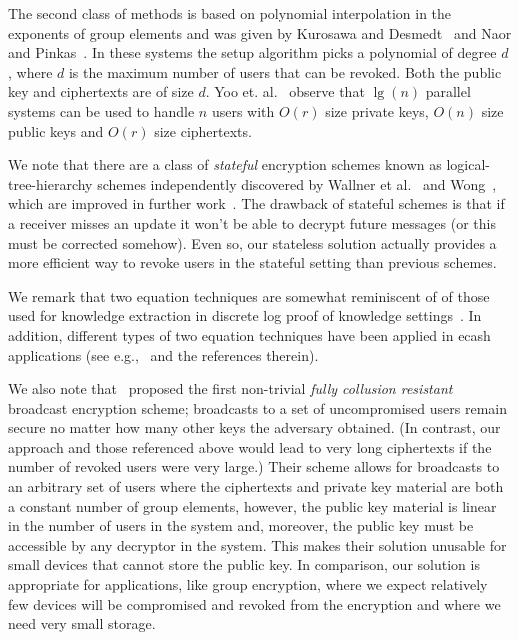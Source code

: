 \documentclass[a4paper, 11pt]{article}
\theoremstyle{definition}
\begin{document}
The second class of methods is based on polynomial interpolation in
the exponents of group elements and was given by Kurosawa and
Desmedt~\cite{KD98} and Naor and Pinkas~\cite{NP01}. In these systems
the setup algorithm picks a polynomial of degree $d$, where $d$ is the
maximum number of users that can be revoked.  Both the public key and
ciphertexts are of size $d$. Yoo et. al.~\cite{parallel} observe that
$\lg(n)$ parallel systems can be used to handle $n$ users with $O(r)$
size private keys, $O(n)$ size public keys and $O(r)$ size
ciphertexts.

We note that there are a class of \emph{stateful} encryption
schemes known as logical-tree-hierarchy schemes independently
discovered by Wallner et al.~\cite{wallner} and Wong~\cite{wong},
which are improved in further work~\cite{CGIMNP99,CMN99,SM03}. The
drawback of stateful schemes is that if a receiver misses an update it
won't be able to decrypt future messages (or this must be corrected
somehow). Even so, our stateless solution actually provides a more
efficient way to revoke users in the stateful setting than previous
schemes.

We remark that two equation techniques are somewhat
reminiscent of of those used for knowledge extraction in discrete log
proof of knowledge settings~\cite{S91}. In addition, different types
of two equation techniques have been applied in ecash applications
(see e.g.,~\cite{CHL05} and the references therein).

We also note that~\cite{BGW05} proposed the first non-trivial
\emph{fully collusion resistant} broadcast encryption scheme;
broadcasts to a set of uncompromised users remain secure no matter how
many other keys the adversary obtained. (In contrast, our approach and those referenced above would lead to very long ciphertexts if the number of revoked users were very large.) Their scheme allows for
broadcasts to an arbitrary set of users where the ciphertexts and
private key material are both a constant number of group elements,
however, the public key material is linear in the number of users in
the system and, moreover, the public key must be accessible by any
decryptor in the system.  This makes their solution unusable for small
devices that cannot store the public key.  In comparison, our solution
is appropriate for applications, like group encryption, where we
expect relatively few devices will be compromised and revoked from the
encryption and where we need very small storage.
\end{document}
